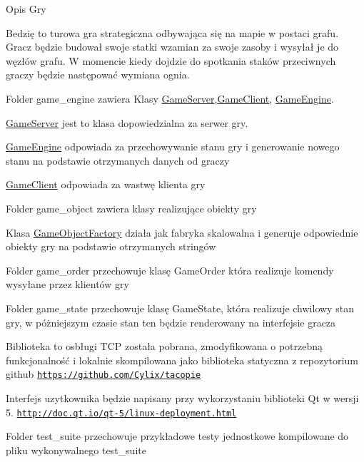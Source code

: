 
\begin{DoxyItemize}
\item Opis Gry
\end{DoxyItemize}

Bedzię to turowa gra strategiczna odbywająca się na mapie w postaci grafu. Gracz będzie budował swoje statki wzamian za swoje zasoby i wysyłał je do węzłów grafu. W momencie kiedy dojdzie do spotkania staków przeciwnych graczy będzie następować wymiana ognia.


\begin{DoxyItemize}
\item Folder game\+\_\+engine zawiera Klasy \hyperlink{classGameServer}{Game\+Server},\hyperlink{classGameClient}{Game\+Client}, \hyperlink{classGameEngine}{Game\+Engine}.
\end{DoxyItemize}

\hyperlink{classGameServer}{Game\+Server} jest to klasa dopowiedzialna za serwer gry.

\hyperlink{classGameEngine}{Game\+Engine} odpowiada za przechowywanie stanu gry i generowanie nowego stanu na podstawie otrzymanych danych od graczy

\hyperlink{classGameClient}{Game\+Client} odpowiada za wastwę klienta gry


\begin{DoxyItemize}
\item Folder game\+\_\+object zawiera klasy realizujące obiekty gry
\end{DoxyItemize}

Klasa \hyperlink{classGameObjectFactory}{Game\+Object\+Factory} działa jak fabryka skalowalna i generuje odpowiednie obiekty gry na podstawie otrzymanych stringów
\begin{DoxyItemize}
\item Folder game\+\_\+order przechowuje klasę Game\+Order która realizuje komendy wysyłane przez klientów gry
\item Folder game\+\_\+state przechowuje klasę Game\+State, która realizuje chwilowy stan gry, w póżniejszym czasie stan ten będzie renderowany na interfejsie gracza
\item Biblioteka to osbługi T\+CP została pobrana, zmodyfikowana o potrzebną funkcjonalność i lokalnie skompilowana jako biblioteka statyczna z repozytorium github \href{https://github.com/Cylix/tacopie}{\tt https\+://github.\+com/\+Cylix/tacopie}
\item Interfejs uzytkownika będzie napisany przy wykorzystaniu biblioteki Qt w wersji 5. \href{http://doc.qt.io/qt-5/linux-deployment.html}{\tt http\+://doc.\+qt.\+io/qt-\/5/linux-\/deployment.\+html}
\item Folder test\+\_\+suite przechowuje przykładowe testy jednostkowe kompilowane do pliku wykonywalnego test\+\_\+suite 
\end{DoxyItemize}